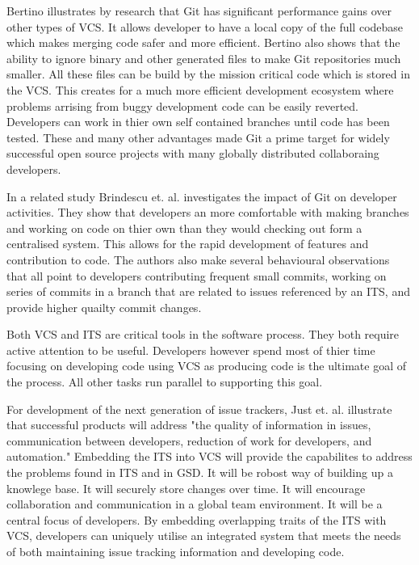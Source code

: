 \documentclass{mproj}
\begin{document}
Bertino \cite{Bertino:2012} illustrates by research that Git has significant performance gains over other types of VCS. It allows developer to have a local copy of the full codebase which makes merging code safer and more efficient. Bertino also shows that the ability to ignore binary and other generated files to make Git repositories much smaller. All these files can be build by the mission critical code which is stored in the VCS. This creates for a much more efficient development ecosystem where problems arrising from buggy development code can be easily reverted. Developers can work in thier own self contained branches until code has been tested. These and many other advantages made Git a prime target for widely successful open source projects with many globally distributed collaboraing developers.

In a related study Brindescu et. al. \cite{Brindescu:2014} investigates the impact of Git on developer activities. They show that developers an more comfortable with making branches and working on code on thier own than they would checking out form a centralised system. This allows for the rapid development of features and contribution to code. The authors also make several behavioural observations that all point to developers contributing frequent small commits, working on series of commits in a branch that are related to issues referenced by an ITS, and provide higher quailty commit changes.

Both VCS and ITS are critical tools in the software process. They both require active attention to be useful. Developers however spend most of thier time focusing on developing code using VCS as producing code is the ultimate goal of the process. All other tasks run parallel to supporting this goal.

For development of the next generation of issue trackers, Just et. al. \cite{Just:2008} illustrate that successful products will address "the quality of information in issues, communication between developers, reduction of work for developers, and automation." Embedding the ITS into VCS will provide the capabilites to address the problems found in ITS and in GSD. It will be robost way of building up a knowlege base. It will securely store changes over time. It will encourage collaboration and communication in a global team environment. It will be a central focus of developers. By embedding overlapping traits of the ITS with VCS, developers can uniquely utilise an integrated system that meets the needs of both maintaining issue tracking information and developing code. 
\end{document}

